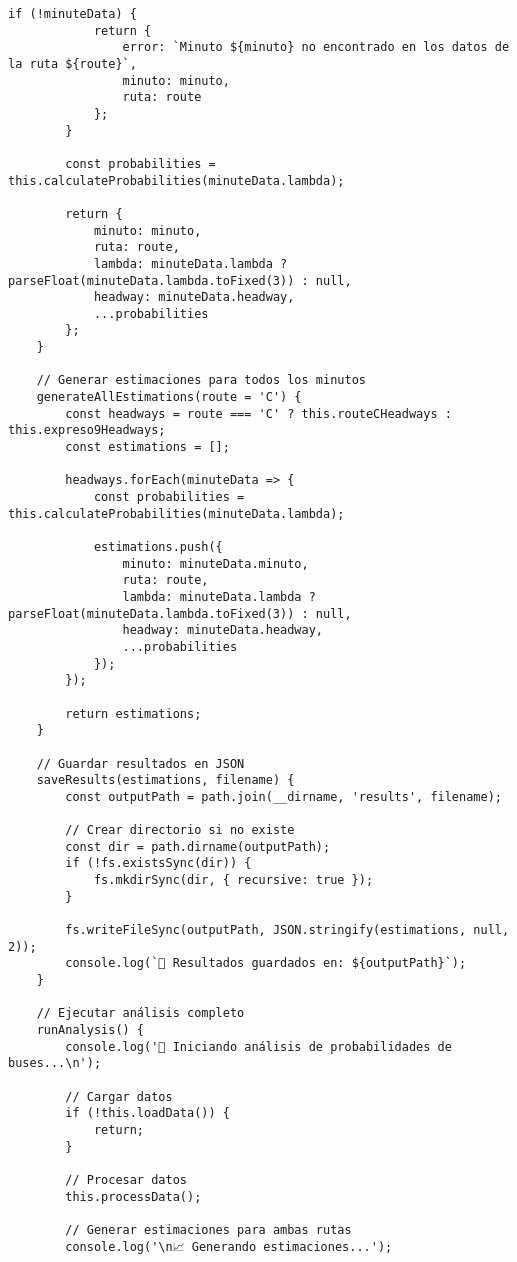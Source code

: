 \documentclass[12pt,a4paper]{article}
\begin{document}
\begin{lstlisting}[caption=bus-probability-estimator.js completo]
        if (!minuteData) {
            return {
                error: `Minuto ${minuto} no encontrado en los datos de la ruta ${route}`,
                minuto: minuto,
                ruta: route
            };
        }

        const probabilities = this.calculateProbabilities(minuteData.lambda);

        return {
            minuto: minuto,
            ruta: route,
            lambda: minuteData.lambda ? parseFloat(minuteData.lambda.toFixed(3)) : null,
            headway: minuteData.headway,
            ...probabilities
        };
    }

    // Generar estimaciones para todos los minutos
    generateAllEstimations(route = 'C') {
        const headways = route === 'C' ? this.routeCHeadways : this.expreso9Headways;
        const estimations = [];

        headways.forEach(minuteData => {
            const probabilities = this.calculateProbabilities(minuteData.lambda);
            
            estimations.push({
                minuto: minuteData.minuto,
                ruta: route,
                lambda: minuteData.lambda ? parseFloat(minuteData.lambda.toFixed(3)) : null,
                headway: minuteData.headway,
                ...probabilities
            });
        });

        return estimations;
    }

    // Guardar resultados en JSON
    saveResults(estimations, filename) {
        const outputPath = path.join(__dirname, 'results', filename);
        
        // Crear directorio si no existe
        const dir = path.dirname(outputPath);
        if (!fs.existsSync(dir)) {
            fs.mkdirSync(dir, { recursive: true });
        }

        fs.writeFileSync(outputPath, JSON.stringify(estimations, null, 2));
        console.log(`💾 Resultados guardados en: ${outputPath}`);
    }

    // Ejecutar análisis completo
    runAnalysis() {
        console.log('🚌 Iniciando análisis de probabilidades de buses...\n');

        // Cargar datos
        if (!this.loadData()) {
            return;
        }

        // Procesar datos
        this.processData();

        // Generar estimaciones para ambas rutas
        console.log('\n📈 Generando estimaciones...');
        

\end{lstlisting}
\end{document}

